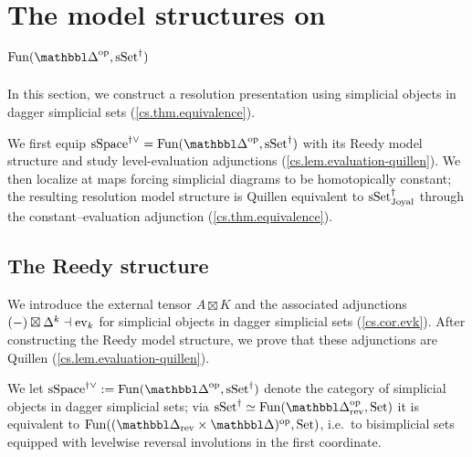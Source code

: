 \documentclass[a4paper,dvipdfmx,11pt]{amsart}
\begin{document}
\section{The model structures on \texorpdfstring{$\Fun(\prism^{\myop},\sSet^{\dag})$}{Fun(Δ,sSet†)}}\label{cs.section}

In this section, we construct a resolution presentation using simplicial objects in dagger simplicial sets (\cref{cs.thm.equivalence}).

We first equip $\sSpace^{\dag\vee}=\Fun(\prism^{\myop},\sSet^{\dag})$ with its Reedy model structure and study level-evaluation adjunctions (\cref{cs.lem.evaluation-quillen}).
We then localize at maps forcing simplicial diagrams to be homotopically constant;
the resulting resolution model structure is Quillen equivalent to $\mathrm{sSet}^{\dag}_{\mathrm{Joyal}}$ through the constant--evaluation adjunction (\cref{cs.thm.equivalence}).

\subsection{The Reedy structure}

We introduce the external tensor $A\boxtimes K$ and the associated adjunctions $(-)\boxtimes\Delta^k\dashv\mathrm{ev}_k$ for simplicial objects in dagger simplicial sets (\cref{cs.cor.evk}).
After constructing the Reedy model structure, we prove that these adjunctions are Quillen  (\cref{cs.lem.evaluation-quillen}).

\begin{notation}\label{cs.not.SS}
  We let $\sSpace^{\dag\vee}:=\Fun(\prism^{\myop},\sSet^{\dag})$ denote the category of simplicial objects in dagger simplicial sets;
  via $\sSet^{\dag}\simeq\Fun(\prism_{\rev}^{\myop},\Set)$ it is equivalent to $\Fun((\prism_{\rev}\times\prism)^{\myop},\Set)$,
  i.e.\ to bisimplicial sets equipped with levelwise reversal involutions in the first coordinate.
\end{notation}
\end{document}
